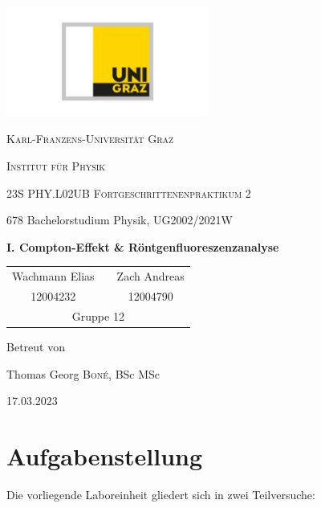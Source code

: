 \documentclass[ngerman]{scrartcl}
\begin{document}
\begin{titlepage}
    \centering
    \includegraphics[width=0.5\textwidth]{../../99_Misc/Logo_KF.pdf}\par\vspace{0.8cm}
    {\scshape\LARGE{Karl-Franzens-Universität Graz}\par}
    {\scshape\LARGE{Institut für Physik}\par}
    \vspace{1cm}
    {\scshape\Large{23S PHY.L02UB Fortgeschrittenenpraktikum 2}\par}
    678 Bachelorstudium Physik, UG2002/2021W\par
    \vspace{1.5cm}
    {\huge\bfseries I. Compton-Effekt \& Röntgenfluoreszenzanalyse\par}
    \vspace{2cm}
    \begin{table}[H]
        \centering
        \begin{tabular}{c c c}
            \Large Wachmann Elias &  & \Large Zach Andreas \\
            \Large 12004232       &  & \Large 12004790     \\
            \multicolumn{3}{c}{Gruppe 12}
        \end{tabular}
    \end{table}
    \vfill
    \Large Betreut von\par
    Thomas Georg \textsc{Boné}, BSc MSc
    \vfill
    {\large 17.03.2023\par}
\end{titlepage}

\clearpage
\tableofcontents
\newpage

\section[Aufgabenstellung]{Aufgabenstellung \cite{ref:angabe_compton,ref:angabe_roentgen}}
\label{sec:aufgabenstellung}

Die vorliegende Laboreinheit gliedert sich in zwei Teilversuche:
\end{document}
